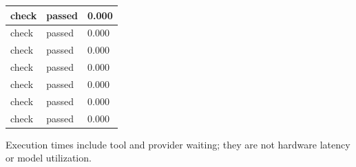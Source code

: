\documentclass[11pt,a4paper]{article}
\begin{document}
{\begin{longtable}{@{}L{0.57\textwidth}|L{0.16\textwidth}|L{0.17\textwidth}@{}}
check & passed & 0.000\\[2pt]\hline

check & passed & 0.000\\[2pt]\hline

check & passed & 0.000\\[2pt]\hline

check & passed & 0.000\\[2pt]\hline

check & passed & 0.000\\[2pt]\hline

check & passed & 0.000\\[2pt]\hline

check & passed & 0.000\\[2pt]\hline

\bottomrule\end{longtable}}

Execution times include tool and provider waiting; they are not hardware latency or model utilization.
\end{document}

